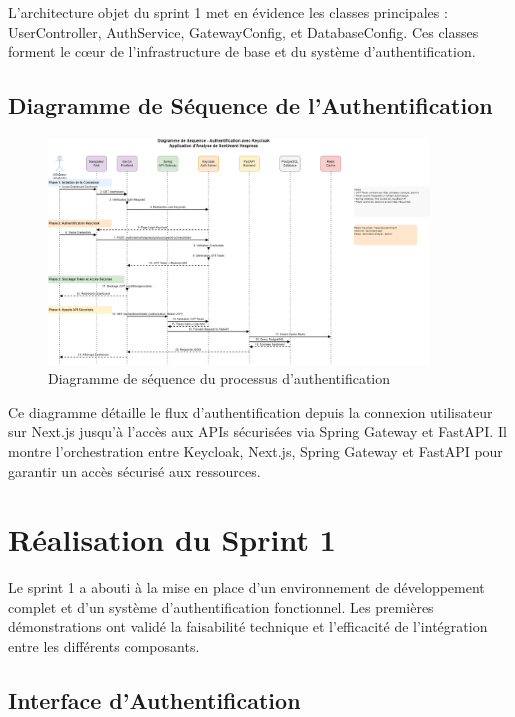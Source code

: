 L'architecture objet du sprint 1 met en évidence les classes principales : UserController, AuthService, GatewayConfig, et DatabaseConfig. Ces classes forment le cœur de l'infrastructure de base et du système d'authentification.

\subsection{Diagramme de Séquence de l'Authentification}

\begin{figure}[H]
\centering
\includegraphics[width=0.9\textwidth]{assets/images/auth-sequence.png}
\caption{Diagramme de séquence du processus d'authentification}
\label{fig:auth-sequence}
\end{figure}

Ce diagramme détaille le flux d'authentification depuis la connexion utilisateur sur Next.js jusqu'à l'accès aux APIs sécurisées via Spring Gateway et FastAPI. Il montre l'orchestration entre Keycloak, Next.js, Spring Gateway et FastAPI pour garantir un accès sécurisé aux ressources.

\section{Réalisation du Sprint 1}

Le sprint 1 a abouti à la mise en place d'un environnement de développement complet et d'un système d'authentification fonctionnel. Les premières démonstrations ont validé la faisabilité technique et l'efficacité de l'intégration entre les différents composants.

\subsection{Interface d'Authentification}

